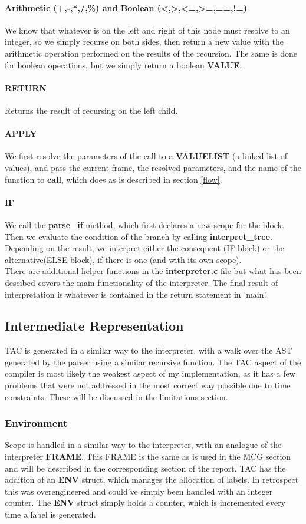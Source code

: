 \documentclass[12pt]{article}
\begin{document}
\paragraph{Arithmetic (+,-,*,/,\%) and Boolean (<,>,<=,>=,==,!=)} We know that whatever is on the left and right of this node must resolve to an integer, so we simply recurse on both sides, then return a new value with the arithmetic operation performed on the results of the recursion. The same is done for boolean operations, but we simply return a boolean \textbf{VALUE}.
\paragraph{RETURN} Returns the result of recursing on the left child.
\paragraph{APPLY} We first resolve the parameters of the call to a \textbf{VALUELIST} (a linked list of values), and pass the current frame, the resolved parameters, and the name of the function to \textbf{call}, which does as is described in section \ref{flow}.
\paragraph{IF} We call the \textbf{parse\_if} method, which first declares a new scope for the block. Then we evaluate the condition of the branch by calling \textbf{interpret\_tree}. Depending on the result, we interpret either the consequent (IF block) or the alternative(ELSE block), if there is one (and with its own scope).
\\\newline There are additional helper functions in the \textbf{interpreter.c} file but what has been descibed covers the main functionality of the interpreter. The final result of interpretation is whatever is contained in the return statement in 'main'.
\subsection{Intermediate Representation}
TAC is generated in a similar way to the interpreter, with a walk over the AST generated by the parser using a similar recursive function. The TAC aspect of the compiler is most likely the weakest aspect of my implementation, as it has a few problems that were not addressed in the most correct way possible due to time constraints. These will be discussed in the limitations section.
\subsubsection{Environment}
Scope is handled in a similar way to the interpreter, with an analogue of the interpreter \textbf{FRAME}. This FRAME is the same as is used in the MCG section and will be described in the corresponding section of the report. 
TAC has the addition of an \textbf{ENV} struct, which manages the allocation of labels. In retrospect this was overengineered and could've simply been handled with an integer counter.
The \textbf{ENV} struct simply holds a counter, which is incremented every time a label is generated. 
\end{document}

